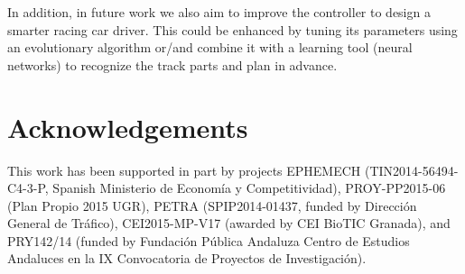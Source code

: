 \documentclass[runningheads,a4paper]{llncs}
\begin{document}
	In addition, in future work we also aim to improve the controller to design a smarter racing car driver. This could be enhanced by tuning its parameters using an evolutionary algorithm or/and combine it with a learning tool (neural networks) to recognize the track parts and plan in advance.
	
	
	
	\section*{Acknowledgements}
	
	This work has been supported in part by projects 
	EPHEMECH (TIN2014-56494-C4-3-P, Spanish Ministerio de Economía y Competitividad), 
	PROY-PP2015-06 (Plan Propio 2015 UGR), 
	PETRA (SPIP2014-01437, funded by Direcci\'on General de Tr\'afico),
	CEI2015-MP-V17 (awarded by CEI BioTIC Granada), and 
	PRY142/14 (funded by Fundaci\'on P\'ublica Andaluza Centro de Estudios Andaluces en la IX Convocatoria de Proyectos de Investigaci\'on).
	
	
	
	
	
	
	
	
\end{document}
